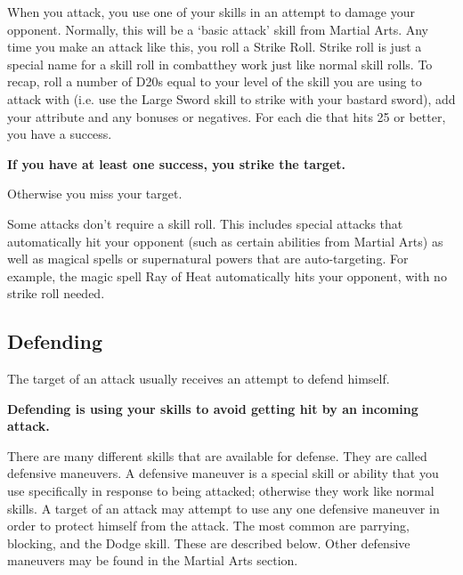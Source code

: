\documentclass[twoside]{book}
\begin{document}
    {  
    When you attack, you use one of your skills in an
              attempt to damage your opponent. Normally, this will be a
              `basic attack' skill from Martial Arts. Any
              time you make an attack like this, you roll a Strike Roll.
              Strike roll is just a special name for a skill roll in
              combatthey work just like normal skill rolls. To
              recap, roll a number of D20s equal to your level of the
              skill you are using to attack with (i.e. use the Large
              Sword skill to strike with your bastard sword), add your
              attribute and any bonuses or negatives. For each die that
              hits 25 or better, you have a success.
               

 \textbf{ If you have at least one success, you strike the
                target. }

  Otherwise you miss your target.
            
    }
  
    {  
    Some attacks don't require a skill roll. This
               includes special attacks that automatically hit your
               opponent (such as certain abilities from Martial Arts) as
               well as magical spells or supernatural powers that are
               auto-targeting. For example, the magic spell Ray of Heat
               automatically hits your opponent, with no strike roll
               needed. 
    }
  
    

\subsection{Defending}
    
    {  
    The target of an attack usually receives an attempt
              to defend himself.
               

 \textbf{ Defending is using your skills to avoid getting hit
                by an incoming attack. }

  There are many different
                skills that are available for defense. They are called
                defensive maneuvers. A defensive maneuver is a special
                skill or ability that you use specifically in response to
                being attacked; otherwise they work like normal skills. A
                target of an attack may attempt to use any one defensive
                maneuver in order to protect himself from the attack. The
                most common are parrying, blocking, and the Dodge skill.
                These are described below. Other defensive maneuvers may
                be found in the Martial Arts section.
            
    }
  
\end{document}
